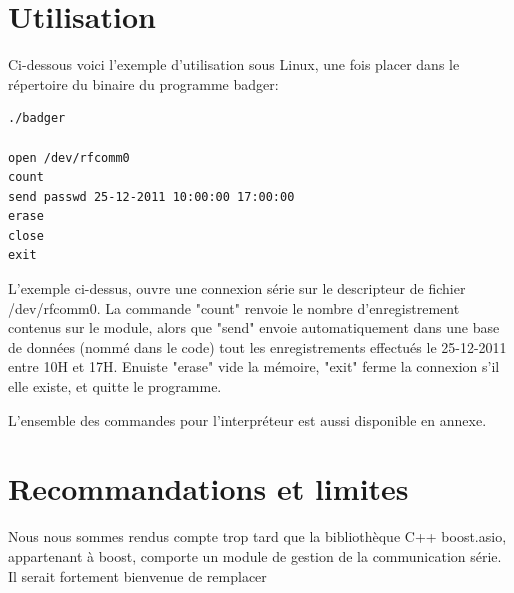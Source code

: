 \section{Utilisation}
    Ci-dessous voici l'exemple d'utilisation sous Linux, une fois placer dans le
répertoire du binaire du programme badger:

    \begin{lstlisting}
./badger

open /dev/rfcomm0
count
send passwd 25-12-2011 10:00:00 17:00:00
erase
close
exit
    \end{lstlisting}

    L'exemple ci-dessus, ouvre une connexion série sur le descripteur de fichier
/dev/rfcomm0. La commande "count" renvoie le nombre d'enregistrement contenus sur 
le module, alors que "send" envoie automatiquement dans une base de données (nommé
dans le code) tout les enregistrements effectués le 25-12-2011 entre 10H et 17H.
Enuiste "erase" vide la mémoire, "exit" ferme la connexion s'il elle existe, et
quitte le programme.

    L'ensemble des commandes pour l'interpréteur est aussi disponible en annexe.




\section{Recommandations et limites}
    Nous nous sommes rendus compte trop tard que la bibliothèque C++ boost.asio,
appartenant à boost, comporte un module de gestion de la communication série. Il
serait fortement bienvenue de remplacer 
 


